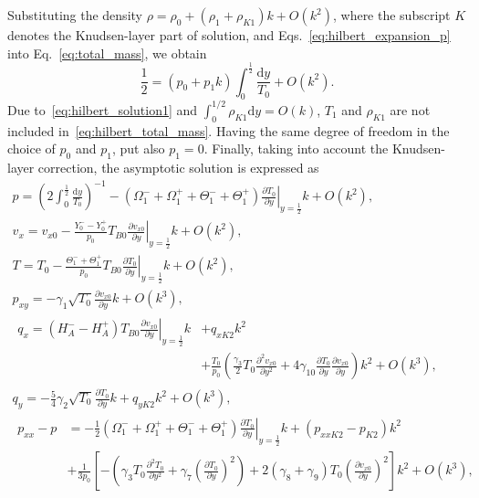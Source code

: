 \documentclass[review]{elsarticle}
\newcommand{\dd}{\mathrm{d}}
\newcommand{\pder}[2][]{\frac{\partial#1}{\partial#2}}
\newcommand{\pderdual}[2][]{\frac{\partial^2#1}{\partial#2^2}}
\newcommand{\OO}[1]{O\left(#1\right)}
\begin{document}
Substituting the density \(\rho = \rho_0 + (\rho_1+\rho_{K1})k + \OO{k^2}\),
where the subscript \(K\) denotes the Knudsen-layer part of solution,
and Eqs.~\eqref{eq:hilbert_expansion_p} into Eq.~\eqref{eq:total_mass}, we obtain
\begin{equation}\label{eq:hilbert_total_mass}
    \frac12 = (p_0 + p_1k)\int_{0}^\frac12\frac{\dd y}{T_0} + \OO{k^2}.
\end{equation}
Due to~\eqref{eq:hilbert_solution1} and \(\int_{0}^{1/2}\rho_{K1}\dd{y} = \OO{k}\),
\(T_1\) and \(\rho_{K1}\) are not included in~\eqref{eq:hilbert_total_mass}.
Having the same degree of freedom in the choice of \(p_0\) and \(p_1\), put also \(p_1 = 0\).
Finally, taking into account the Knudsen-layer correction, the asymptotic solution is expressed as
\begin{gather}
    p = \left( 2\int_{0}^\frac12\frac{\dd{y}}{T_0} \right)^{-1}
        - (\Omega_1^-+\Omega_1^+ + \Theta_1^-+\Theta_1^+)\left.\pder[T_0]{y}\right|_{y=\frac12}k + \OO{k^2}, \label{eq:Hilbert_p}\\
    v_x = v_{x0} - \frac{Y_0^--Y_0^+}{p_0}T_{B0}\left.\pder[v_{x0}]{y}\right|_{y=\frac12}k + \OO{k^2}, \label{eq:Hilbert_U}\\
    T = T_0 - \frac{\Theta_1^-+\Theta_1^+}{p_0}T_{B0}\left.\pder[T_0]{y}\right|_{y=\frac12}k + \OO{k^2}, \label{eq:Hilbert_T}\\
    p_{xy} = -\gamma_1\sqrt{T_0}\pder[v_{x0}]{y}k + \OO{k^3}, \label{eq:Hilbert_Pxy}\\
    \begin{aligned}
        q_x = (H_A^--H_A^+)T_{B0}\left.\pder[v_{x0}]{y}\right|_{y=\frac12}k &+ q_{xK2}k^2 \\
        &+ \frac{T_0}{p_0}\left(\frac{\gamma_3}2 T_0 \pderdual[v_{x0}]{y}
        + 4\gamma_{10} \pder[T_0]{y}\pder[v_{x0}]{y}\right)k^2 + \OO{k^3},
    \end{aligned}\label{eq:Hilbert_Qx}\\
    q_y = -\frac54\gamma_2\sqrt{T_0}\pder[T_0]{y}k + q_{yK2}k^2 + \OO{k^3}, \label{eq:Hilbert_Qy}\\
    \begin{aligned}
    p_{xx} - p &= -\frac12 (\Omega_1^-+\Omega_1^+ + \Theta_1^-+\Theta_1^+)\left.\pder[T_0]{y}\right|_{y=\frac12}k
        + (p_{xxK2}-p_{K2})k^2 \\
        &+ \frac1{3p_0}\left[-\left(\gamma_3 T_0 \pderdual[T_0]{y} + \gamma_7\left(\pder[T_0]{y}\right)^2\right)
        + 2(\gamma_8+\gamma_9)T_0\left(\pder[v_{x0}]{y}\right)^2\right]k^2 + \OO{k^3},
    \end{aligned}\label{eq:Hilbert_Pxx}\\

\end{gather}
\end{document}
